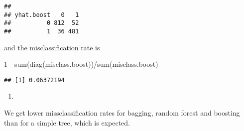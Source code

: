 \documentclass[
]{article}
\newenvironment{Shaded}{\begin{snugshade}}{\end{snugshade}}
\newcommand{\DecValTok}[1]{\textcolor[rgb]{0.00,0.00,0.81}{#1}}
\newcommand{\FunctionTok}[1]{\textcolor[rgb]{0.00,0.00,0.00}{#1}}
\newcommand{\NormalTok}[1]{#1}
\newcommand{\SpecialCharTok}[1]{\textcolor[rgb]{0.00,0.00,0.00}{#1}}
\providecommand{\tightlist}{%
  \setlength{\itemsep}{0pt}\setlength{\parskip}{0pt}}
\begin{document}
\begin{verbatim}
##           
## yhat.boost   0   1
##          0 812  52
##          1  36 481
\end{verbatim}

and the misclassification rate is

\begin{Shaded}
\begin{Highlighting}[]
\DecValTok{1} \SpecialCharTok{{-}} \FunctionTok{sum}\NormalTok{(}\FunctionTok{diag}\NormalTok{(misclass.boost))}\SpecialCharTok{/}\FunctionTok{sum}\NormalTok{(misclass.boost)}
\end{Highlighting}
\end{Shaded}

\begin{verbatim}
## [1] 0.06372194
\end{verbatim}

\begin{enumerate}
\def\labelenumi{\roman{enumi})}
\tightlist
\item
\end{enumerate}

We get lower missclassification rates for bagging, random forest and
boosting than for a simple tree, which is expected.
\end{document}
